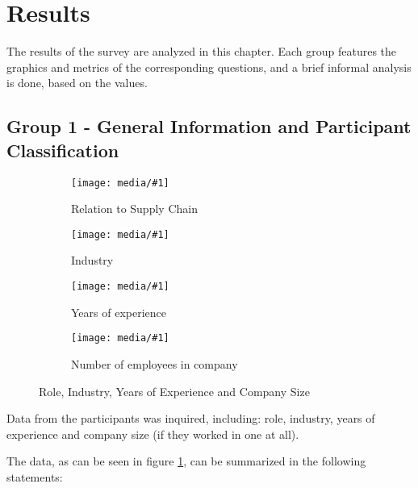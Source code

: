 
\section{Results}



The results of the survey are analyzed in this chapter. Each group features the graphics and metrics of the corresponding questions, and a brief informal analysis is done, based on the values.



\subsection{Group 1 - General Information and Participant Classification}

\newcommand{\resfig}[2]{
    \begin{subfigure}{.55\textwidth}
        \centering
        \texttt{[image: media/\#1]}
        \caption{#2}
    \end{subfigure}
}

\begin{figure}[ht]

    \resfig{sc_role}{Relation to Supply Chain}
    \resfig{sc_industry}{Industry}

    \resfig{sc_experience}{Years of experience}
    \resfig{nr_employees}{Number of employees in company}

      \caption{Role, Industry, Years of Experience and Company Size}
    \label{fig:group1_graphics}
\end{figure}


Data from the participants was inquired, including: role, industry, years of experience and company size (if  they worked in one at all).

The data, as can be seen in figure \ref{fig:group1_graphics}, can be summarized in the following statements:



